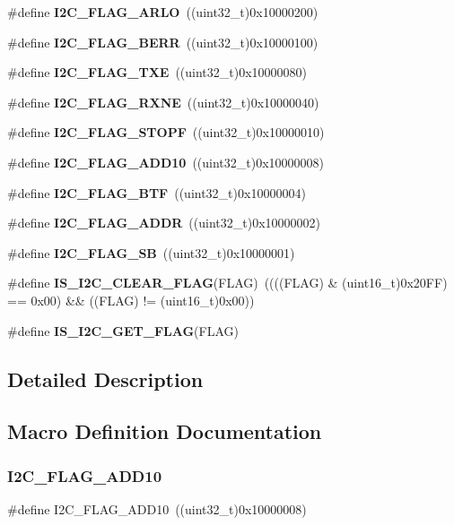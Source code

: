 \begin{DoxyCompactItemize}
\item 
\#define \textbf{ I2\+C\+\_\+\+F\+L\+A\+G\+\_\+\+A\+R\+LO}~((uint32\+\_\+t)0x10000200)
\item 
\#define \textbf{ I2\+C\+\_\+\+F\+L\+A\+G\+\_\+\+B\+E\+RR}~((uint32\+\_\+t)0x10000100)
\item 
\#define \textbf{ I2\+C\+\_\+\+F\+L\+A\+G\+\_\+\+T\+XE}~((uint32\+\_\+t)0x10000080)
\item 
\#define \textbf{ I2\+C\+\_\+\+F\+L\+A\+G\+\_\+\+R\+X\+NE}~((uint32\+\_\+t)0x10000040)
\item 
\#define \textbf{ I2\+C\+\_\+\+F\+L\+A\+G\+\_\+\+S\+T\+O\+PF}~((uint32\+\_\+t)0x10000010)
\item 
\#define \textbf{ I2\+C\+\_\+\+F\+L\+A\+G\+\_\+\+A\+D\+D10}~((uint32\+\_\+t)0x10000008)
\item 
\#define \textbf{ I2\+C\+\_\+\+F\+L\+A\+G\+\_\+\+B\+TF}~((uint32\+\_\+t)0x10000004)
\item 
\#define \textbf{ I2\+C\+\_\+\+F\+L\+A\+G\+\_\+\+A\+D\+DR}~((uint32\+\_\+t)0x10000002)
\item 
\#define \textbf{ I2\+C\+\_\+\+F\+L\+A\+G\+\_\+\+SB}~((uint32\+\_\+t)0x10000001)
\item 
\#define \textbf{ I\+S\+\_\+\+I2\+C\+\_\+\+C\+L\+E\+A\+R\+\_\+\+F\+L\+AG}(F\+L\+AG)~((((F\+L\+AG) \& (uint16\+\_\+t)0x20\+F\+F) == 0x00) \&\& ((\+F\+L\+A\+G) != (uint16\+\_\+t)0x00))
\item 
\#define \textbf{ I\+S\+\_\+\+I2\+C\+\_\+\+G\+E\+T\+\_\+\+F\+L\+AG}(F\+L\+AG)
\end{DoxyCompactItemize}


\subsection{Detailed Description}


\subsection{Macro Definition Documentation}
\mbox{\label{group__I2C__flags__definition_ga316c78cbf34b74da96d69f702a0d1444}} 
\subsubsection{I2\+C\+\_\+\+F\+L\+A\+G\+\_\+\+A\+D\+D10}
{\footnotesize\ttfamily \#define I2\+C\+\_\+\+F\+L\+A\+G\+\_\+\+A\+D\+D10~((uint32\+\_\+t)0x10000008)}



